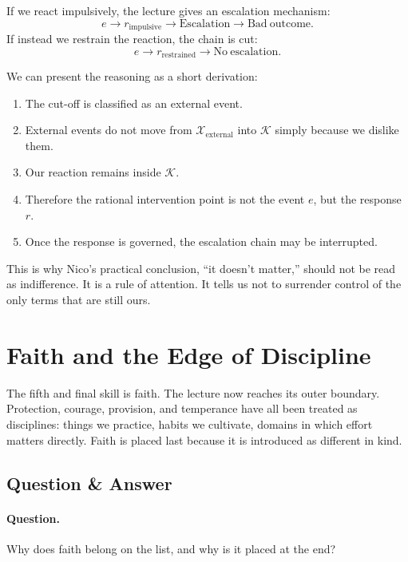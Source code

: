 If we react impulsively, the lecture gives an escalation mechanism:
\begin{equation}
e \to r_{\mathrm{impulsive}} \to \mathrm{Escalation} \to \mathrm{Bad\ outcome}.
\end{equation}
If instead we restrain the reaction, the chain is cut:
\begin{equation}
e \to r_{\mathrm{restrained}} \to \mathrm{No\ escalation}.
\end{equation}

We can present the reasoning as a short derivation:
\begin{enumerate}
\item The cut-off is classified as an external event.
\item External events do not move from \(\mathcal{X}_{\mathrm{external}}\) into \(\mathcal{K}\) simply because we dislike them.
\item Our reaction remains inside \(\mathcal{K}\).
\item Therefore the rational intervention point is not the event \(e\), but the response \(r\).
\item Once the response is governed, the escalation chain may be interrupted.
\end{enumerate}

This is why Nico's practical conclusion, ``it doesn't matter,'' should not be read as indifference. It is a rule of attention. It tells us not to surrender control of the only terms that are still ours.

\section{Faith and the Edge of Discipline}

The fifth and final skill is faith. The lecture now reaches its outer boundary. Protection, courage, provision, and temperance have all been treated as disciplines: things we practice, habits we cultivate, domains in which effort matters directly. Faith is placed last because it is introduced as different in kind.

\subsection{Question \& Answer}

\paragraph{Question.} Why does faith belong on the list, and why is it placed at the end?


